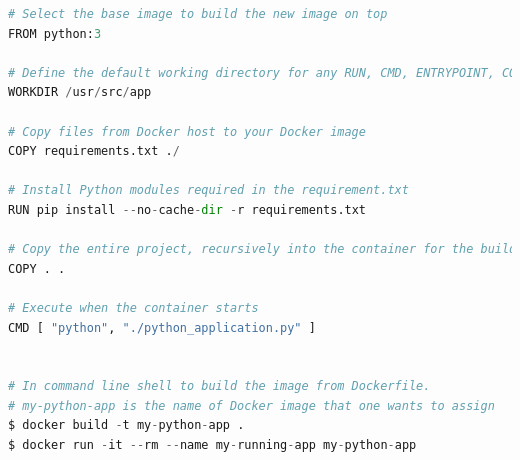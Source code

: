 \begin{lstlisting}[language=Python, caption={Example of Dockerfile}, label={lst:dockerfile}]
# Select the base image to build the new image on top
FROM python:3

# Define the default working directory for any RUN, CMD, ENTRYPOINT, COPY and ADD command
WORKDIR /usr/src/app

# Copy files from Docker host to your Docker image
COPY requirements.txt ./

# Install Python modules required in the requirement.txt
RUN pip install --no-cache-dir -r requirements.txt

# Copy the entire project, recursively into the container for the build
COPY . .

# Execute when the container starts
CMD [ "python", "./python_application.py" ]


# In command line shell to build the image from Dockerfile.
# my-python-app is the name of Docker image that one wants to assign 
$ docker build -t my-python-app .
$ docker run -it --rm --name my-running-app my-python-app

\end{lstlisting}


